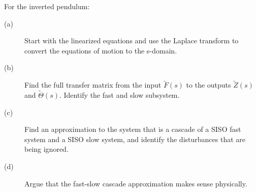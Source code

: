  For the inverted pendulum:
  \begin{description}
    \item[(a)] Start with the linearized equations and use the Laplace transform to convert the equations of motion to the s-domain. 
    \item[(b)] Find the full transfer matrix from the input $\tilde{F}(s)$ to the outputs $\tilde{Z}(s)$ and $\tilde{\Theta}(s)$.  Identify the fast and slow subsystem.
    \item[(c)] Find an approximation to the system that is a cascade of a SISO fast system and a SISO slow system, and identify the disturbances that are being ignored.
    \item[(d)] Argue that the fast-slow cascade approximation makes sense physically.
  \end{description}
